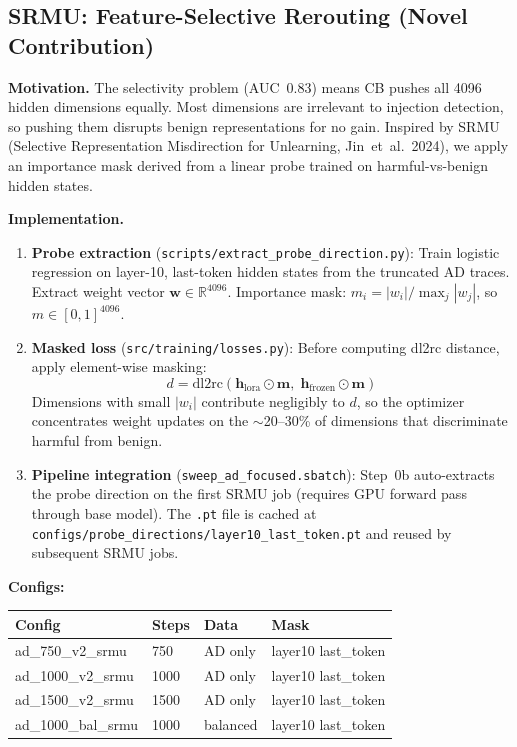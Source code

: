 \documentclass[11pt]{article}
\begin{document}
\subsection{SRMU: Feature-Selective Rerouting (Novel Contribution)}

\textbf{Motivation.} The selectivity problem (AUC~0.83) means CB pushes all
4096 hidden dimensions equally.  Most dimensions are irrelevant to injection
detection, so pushing them disrupts benign representations for no gain.
Inspired by SRMU (Selective Representation Misdirection for Unlearning,
Jin~et~al.\ 2024), we apply an importance mask derived from a linear probe
trained on harmful-vs-benign hidden states.

\textbf{Implementation.}
\begin{enumerate}
  \item \textbf{Probe extraction} (\texttt{scripts/extract\_probe\_direction.py}):
        Train logistic regression on layer-10, last-token hidden states from
        the truncated AD traces.  Extract weight vector $\mathbf{w} \in
        \mathbb{R}^{4096}$.  Importance mask: $m_i = |w_i| / \max_j |w_j|$,
        so $m \in [0,1]^{4096}$.

  \item \textbf{Masked loss} (\texttt{src/training/losses.py}): Before
        computing dl2rc distance, apply element-wise masking:
        \[
          d = \mathrm{dl2rc}(\mathbf{h}_{\text{lora}} \odot \mathbf{m},\;
                             \mathbf{h}_{\text{frozen}} \odot \mathbf{m})
        \]
        Dimensions with small $|w_i|$ contribute negligibly to $d$, so the
        optimizer concentrates weight updates on the $\sim$20--30\% of
        dimensions that discriminate harmful from benign.

  \item \textbf{Pipeline integration} (\texttt{sweep\_ad\_focused.sbatch}):
        Step~0b auto-extracts the probe direction on the first SRMU job
        (requires GPU forward pass through base model).  The \texttt{.pt}
        file is cached at \texttt{configs/probe\_directions/layer10\_last\_token.pt}
        and reused by subsequent SRMU jobs.
\end{enumerate}

\textbf{Configs:}
\begin{center}
\small
\begin{tabular}{llll}
\toprule
Config & Steps & Data & Mask \\
\midrule
ad\_750\_v2\_srmu  & 750  & AD only & layer10 last\_token \\
ad\_1000\_v2\_srmu & 1000 & AD only & layer10 last\_token \\
ad\_1500\_v2\_srmu & 1500 & AD only & layer10 last\_token \\
ad\_1000\_bal\_srmu & 1000 & balanced & layer10 last\_token \\
\bottomrule
\end{tabular}
\end{center}
\end{document}
